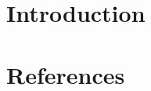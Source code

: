 \documentclass[review,number,sort&compress,12pt]{elsarticle}
\begin{document}
\section{Introduction\label{sect::intro}}


\section*{References}



\end{document}
